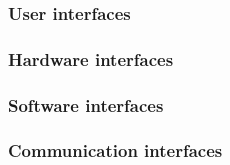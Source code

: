\subsubsection{User interfaces}


\subsubsection{Hardware interfaces}


\subsubsection{Software interfaces}

\subsubsection{Communication interfaces}


